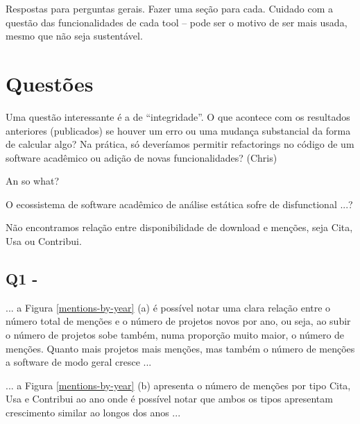 \label{discussao}


Respostas para perguntas gerais. Fazer uma seção para cada.
Cuidado com a questão das funcionalidades de cada tool -- pode ser o motivo de ser mais usada,
mesmo que não seja sustentável.

\section{Questões} 

Uma questão interessante é a de ``integridade''. 
O que acontece com os resultados anteriores (publicados)
se houver um erro ou uma mudança substancial da forma de calcular algo?
Na prática, só deveríamos permitir refactorings no código 
de um software acadêmico ou adição de novas funcionalidades?
(Chris)

An so what?

O ecossistema de software acadêmico de análise estática sofre de disfunctional ...?


Não encontramos relação entre disponibilidade de download e menções, seja Cita, Usa ou Contribui.

\subsection{Q1 - \QuestaoUm}

... a Figura \ref{mentions-by-year} (a) é possível notar uma clara relação
entre o número total de menções e o número de projetos novos por ano, ou seja,
ao subir o número de projetos sobe também, numa proporção muito maior, o número
de menções. Quanto mais projetos mais menções, mas também o número de menções
a software de modo geral cresce ...

... a Figura \ref{mentions-by-year} (b) apresenta o número de menções por tipo Cita, Usa e Contribui ao
ano onde é possível notar que ambos os tipos apresentam crescimento similar ao longos dos anos ...

